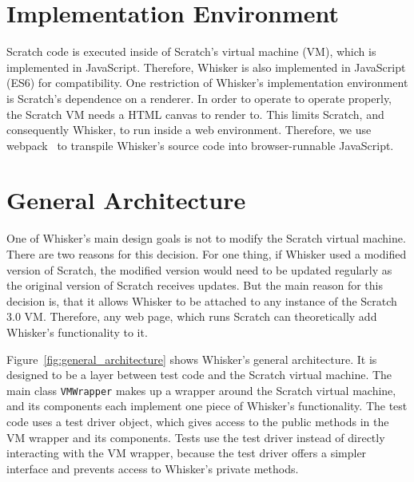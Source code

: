 \section{Implementation Environment}
\label{sec:implementation_environment}

Scratch code is executed inside of Scratch's virtual machine (VM), which is implemented in JavaScript.
Therefore, Whisker is also implemented in JavaScript (ES6) for compatibility.
One restriction of Whisker's implementation environment is Scratch's dependence on a renderer.
In order to operate to operate properly, the Scratch VM needs a HTML canvas to render to.
This limits Scratch, and consequently Whisker, to run inside a web environment.
Therefore, we use webpack~\cite{webpack} to transpile Whisker's source code into browser-runnable JavaScript.

\section{General Architecture}
\label{sec:general_architecture}


One of Whisker's main design goals is not to modify the Scratch virtual machine.
There are two reasons for this decision.
For one thing, if Whisker used a modified version of Scratch,
the modified version would need to be updated regularly as the original version of Scratch receives updates.
But the main reason for this decision is, that it allows Whisker to be attached to any instance of the Scratch 3.0 VM.
Therefore, any web page, which runs Scratch can theoretically add Whisker's functionality to it.
\parspace

Figure~\ref{fig:general_architecture} shows Whisker's general architecture.
It is designed to be a layer between test code and the Scratch virtual machine.
The main class \texttt{VMWrapper} makes up a wrapper around the Scratch virtual machine,
and its components each implement one piece of Whisker's functionality.
The test code uses a test driver object, which gives access to the public methods in the VM wrapper and its components.
Tests use the test driver instead of directly interacting with the VM wrapper,
because the test driver offers a simpler interface and prevents access to Whisker's private methods.
\parspace

